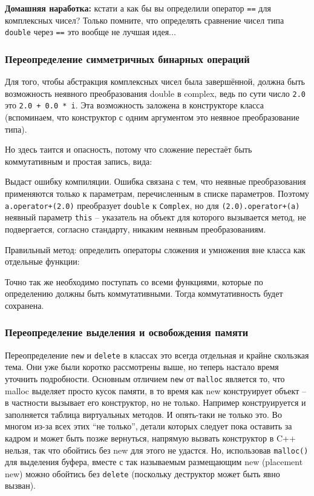 \documentclass[a4paper,12pt,oneside]{article}
\begin{document}
\textbf{Домашняя наработка:} кстати а как бы вы определили оператор \lstinline!==! для комплексных чисел? Только помните, что определять сравнение чисел типа \lstinline!double! через \lstinline!==! это вообще не лучшая идея...

\subsubsection{Переопределение симметричных бинарных операций}\label{SymmBinary}

Для того, чтобы абстракция комплексных чисел была завершённой, должна быть возможность неявного преобразования double в complex, ведь по сути число \lstinline!2.0! это \lstinline!2.0 + 0.0 * i!. Эта возможность заложена в конструкторе класса (вспоминаем, что конструктор с одним аргументом это неявное преобразование типа).



Но здесь таится и опасность, потому что сложение перестаёт быть коммутативным и простая запись, вида:



Выдаст ошибку компиляции. Ошибка связана с тем, что неявные преобразования применяются только к параметрам, перечисленным в списке параметров. Поэтому \lstinline!a.operator+(2.0)! преобразует \lstinline!double! к \lstinline!Complex!, но для \lstinline!(2.0).operator+(a)! неявный параметр \lstinline!this! -- указатель на объект для которого вызывается метод, не подвергается, согласно стандарту, никаким неявным преобразованиям.

Правильный метод: определить операторы сложения и умножения вне класса как отдельные функции:



Точно так же необходимо поступать со всеми функциями, которые по определению должны быть коммутативными. Тогда коммутативность будет сохранена.

\subsubsection{Переопределение выделения и освобождения памяти}

Переопределение \lstinline!new! и \lstinline!delete! в классах это всегда отдельная и крайне скользкая тема. Они уже были коротко рассмотрены выше, но теперь настало время уточнить подробности. Основным отличием \lstinline!new! от \lstinline!malloc! является то, что malloc выделяет просто кусок памяти, в то время как new конструирует объект -- в частности вызывает его конструктор, но не только. Например конструируется и заполняется таблица виртуальных методов. И опять-таки не только это. Во многом из-за всех этих ``не только'', детали которых следует пока оставить за кадром и может быть позже вернуться, напрямую вызвать конструктор в C++ нельзя, так что обойтись без new для этого не удастся. Но, использовав \lstinline!malloc()! для выделения буфера, вместе с так называемым размещающим new (placement new) можно обойтись без \lstinline!delete! (поскольку деструктор может быть явно вызван).
\end{document}
